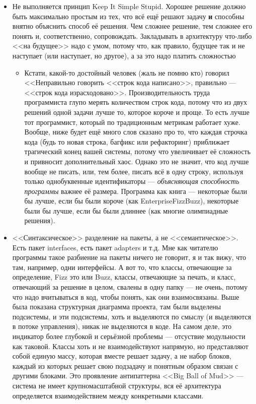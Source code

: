 \documentclass[a5paper]{article}
\begin{document}
\begin{itemize}
    \item Не выполняется принцип Keep It Simple Stupid. Хорошее решение должно быть максимально простым из тех, что всё ещё решают задачу \textbf{и} способны внятно объяснить способ её решения. Чем сложнее решение, тем сложнее его понять и, соответственно, сопровождать. Закладывать в архитектуру что-либо <<на будущее>> надо с умом, потому что, как правило, будущее так и не наступает (или наступает, но другое), а за это надо платить сложностью
    \begin{itemize}
        \item Кстати, какой-то достойный человек (жаль не помню кто) говорил <<Неправильно говорить <<строк кода написано>>, правильно --- <<строк кода израсходовано>>. Производительность труда программиста глупо мерять количеством строк кода, потому что из двух решений одной задачи лучше то, которое короче и проще. То есть лучше тот программист, который по традиционным метрикам работает хуже. Вообще, ниже будет ещё много слов сказано про то, что каждая строчка кода (будь то новая строка, багфикс или рефакторинг) приближает трагический конец вашей системы, потому что увеличивает её сложность и привносит дополнительный хаос. Однако это не значит, что код лучше вообще не писать, или, тем более, писать всё в одну строку, используя только однобуквенные идентификаторы --- \textit{объясняющая способность программы} важнее её размера. Программа как книга --- некоторые были бы лучше, если бы были короче (как EnterpriseFizzBuzz), некоторые были бы лучше, если бы были длиннее (как многие олимпиадные решения).
    \end{itemize}
    \item <<Синтаксическое>> разделение на пакеты, а не <<семантическое>>. Есть пакет interfaces, есть пакет adapters и т.д. Мне как читателю программы такое разбиение на пакеты ничего не говорит, я и так вижу, что там, например, одни интерфейсы. А вот то, что классы, отвечающие за определение, Fizz это или Buzz, классы, отвечающие за печать, и класс, отвечающий за решение в целом, свалены в одну папку --- не очень, потому что надо вчитываться в код, чтобы понять, как они взаимосвязаны. Выше была показана структурная диаграмма проекта, там были выделены подсистемы, и эти подсистемы, хоть и выделяются по смыслу (и выделяются в потоке управления), никак не выделяются в коде. На самом деле, это индикатор более глубокой и серьёзной проблемы --- отсуствие модульности как таковой. Классы хоть и не взаимодействуют напрямую, но представляют собой единую массу, которая вместе решает задачу, а не набор блоков, каждый из которых решает свою подзадачу и понятным образом связан с другими блоками. Это проявление антипаттерна <<Big Ball of Mud>> --- система не имеет крупномасштабной структуры, вся её архитектура определяется взаимодействием между конкретными классами.

\end{itemize}
\end{document}
